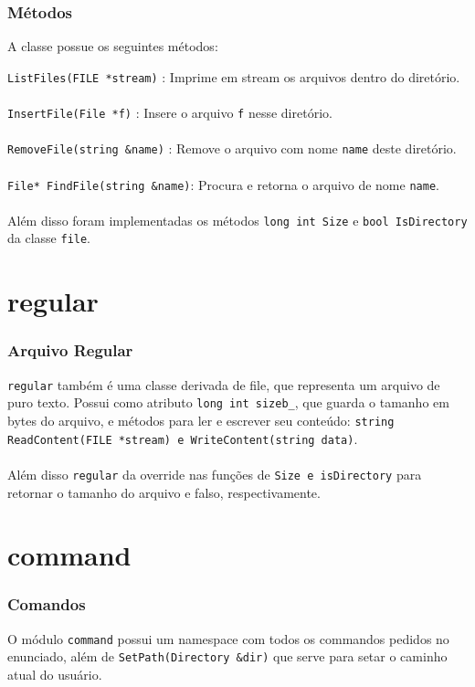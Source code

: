 \documentclass{beamer}
\begin{document}
\begin{frame}
	\frametitle{Métodos}
	A classe possue os seguintes métodos:
	
	\texttt{ListFiles(FILE *stream)}     : Imprime em stream os arquivos dentro do diretório. \\~\\
	\texttt{InsertFile(File *f)}         : Insere o arquivo \texttt{f} nesse diretório.\\~\\
	\texttt{RemoveFile(string &name)}    : Remove o arquivo com nome \texttt{name} deste diretório.\\~\\
	\texttt{File* FindFile(string &name)}: Procura e retorna o arquivo de nome \texttt{name}.\\~\\ 
	
	
	Além disso foram implementadas os métodos \texttt{long int Size} e \texttt{bool IsDirectory} da classe \texttt{file}. 
\end{frame}


\section{regular}

\begin{frame}
  \frametitle{Arquivo Regular}
	\texttt{regular} também é uma classe derivada de file, que representa um arquivo de puro texto.
  Possui como atributo \texttt{long int sizeb\_}, que guarda o tamanho em bytes do arquivo, e métodos para ler e escrever seu conteúdo: \texttt{string ReadContent(FILE *stream) e WriteContent(string data)}.\\~\\

  Além disso \texttt{regular} da override nas funções de \texttt{Size e isDirectory} para retornar o tamanho do arquivo e falso, respectivamente.
\end{frame}


\section{command}

\begin{frame}
  \frametitle{Comandos}
  O módulo \texttt{command} possui um namespace com todos os commandos pedidos no enunciado, além de \texttt{SetPath(Directory &dir)} que serve para setar o caminho atual do usuário.
\end{frame}
\end{document}
